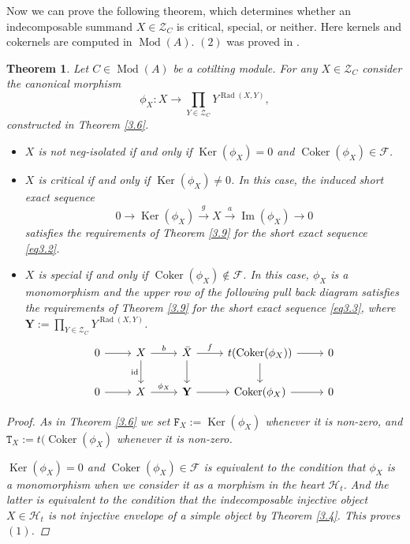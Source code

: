 \documentclass[12pt]{amsart}
\numberwithin{equation}{section}
\newtheorem{theorem}[lemma]{Theorem}
\theoremstyle{definition}
\DeclareMathOperator{\Mod}{Mod}
\DeclareMathOperator{\id}{id}
\DeclareMathOperator{\Ker}{Ker}
\DeclareMathOperator{\Coker}{Coker}
\DeclareMathOperator{\Imm}{Im}
\DeclareMathOperator{\Rad}{Rad}
\newtheorem*{theorem 0*}{Theorem}
\newtheorem*{theorem a*}{Theorem A}
\newtheorem*{theorem b*}{Theorem B}
\newcounter{diagram}
\numberwithin{diagram}{section}
\begin{document}
	Now we can prove the following theorem, which determines whether an indecomposable summand $X\in\mathcal{Z}_C$ is critical, special, or neither.
	Here kernels and cokernels are computed in $\Mod(A)$. $(2)$ was proved in \cite{EN}.
	\begin{theorem}\label{3.10}
	Let $C\in \Mod(A)$ be a cotilting module. For any $X\in\mathcal{Z}_C$ consider the canonical morphism
	\begin{equation*}
		\phi_X:X\longrightarrow \prod_{Y\in\mathcal{Z}_C}Y^{\Rad(X,Y)},
	\end{equation*}
	constructed in Theorem \ref{3.6}.
	\begin{itemize}
	\item[(1)]
	$X$ is not neg-isolated if and only if $\Ker(\phi_X)=0$ and $\Coker(\phi_X)\in\mathcal{F}$.
	\item[(2)]
	$X$ is critical if and only if $\Ker(\phi_X)\neq 0$. In this case, the induced short exact sequence
	\[0\rightarrow\Ker(\phi_X)\overset{g}{\longrightarrow} X\overset{a}{\longrightarrow} \Imm(\phi_X)\rightarrow 0\]
	satisfies the requirements of Theorem \ref{3.9} for the short exact sequence \eqref{eq3.2}.
	\item[(3)]
	$X$ is special if and only if $\Coker(\phi_X)\notin\mathcal{F}$. In this case, $\phi_X$ is a monomorphism and the upper row of the following pull back diagram satisfies the requirements of Theorem \ref{3.9} for the short exact sequence \eqref{eq3.3}, where $\textbf{Y}:=\prod_{Y\in\mathcal{Z}_C}Y^{\Rad(X,Y)}$.
	\[\begin{tikzcd}
	0 & X & {\bar{X}} & {t(\Coker(\phi_X))} & 0 \\
	0 & X & {\textbf{Y}} & {\Coker(\phi_X)} & 0
	\arrow[from=1-1, to=1-2]
	\arrow["b", from=1-2, to=1-3]
	\arrow["\id"', from=1-2, to=2-2]
	\arrow["f", from=1-3, to=1-4]
	\arrow[from=1-3, to=2-3]
	\arrow[from=1-4, to=1-5]
	\arrow[from=1-4, to=2-4]
	\arrow[from=2-1, to=2-2]
	\arrow["{\phi_X}", from=2-2, to=2-3]
	\arrow[from=2-3, to=2-4]
	\arrow[from=2-4, to=2-5]
\end{tikzcd}\]
	\end{itemize}
	\begin{proof}
	As in Theorem \ref{3.6} we set $\mathtt{F}_X:=\Ker(\phi_X)$ whenever it is non-zero, and $\mathtt{T}_X:=t(\Coker(\phi_X)$ whenever it is non-zero.
	
	$\Ker(\phi_X)=0$ and $\Coker(\phi_X)\in\mathcal{F}$ is equivalent to the condition that $\phi_X$ is a monomorphism when we consider it as a morphism in the heart $\mathcal{H}_t$. And the latter is equivalent to the condition that the indecomposable injective object $X\in \mathcal{H}_t$ is not injective envelope of a simple object by Theorem \ref{3.4}. This proves $(1)$.
	

\end{proof}
\end{theorem}
\end{document}
